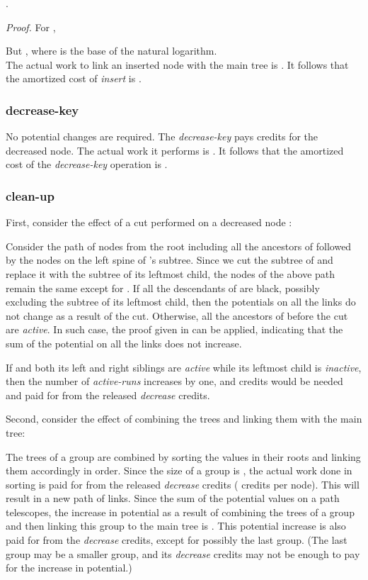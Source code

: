 \begin{prop}
.
\end{prop}

{\it Proof.}
For ,


But , where  is the base of the natural logarithm.
\hfill  \\


The actual work to link an inserted node with the main tree is . It follows that the amortized cost of {\it insert} is .


\subsubsection{decrease-key}
No potential changes are required. The {\it decrease-key} pays  credits for the decreased node. The actual work it performs is . It follows that the amortized cost of the {\it decrease-key} operation is .


\subsubsection{clean-up} 

First, consider the effect of a cut performed on a decreased node :

Consider the path of nodes from the root including all the ancestors of  followed by the nodes on the left spine of 's subtree. Since we cut the subtree of  and replace it with the subtree of its leftmost child, the nodes of the above path remain the same except for .
If all the descendants of  are black, possibly excluding the subtree of its leftmost child, then the potentials on all the links do not change as a result of the cut. Otherwise, all the ancestors of  before the cut are {\it active}. 
In such case, the proof given in \cite{elm0}can be applied, indicating that the sum of the potential on all the links does not increase.

If  and both its left and right siblings are {\it active} while its leftmost child is {\it inactive}, then the number of {\it active-runs} increases by one, and  credits would be needed and paid for from the released {\it decrease} credits. 


Second, consider the effect of combining the trees and linking them with the main tree: 

The trees of a group are combined by sorting the values in their roots and linking them accordingly in order.  Since the size of a group is , the actual work done in sorting is paid for from the released {\it decrease} credits ( credits per node). This will result in a new path of links. Since the sum of the potential values on a path telescopes, the increase in potential as a result of combining the trees of a group and then linking this group to the main tree is . This  potential increase is also paid for from the {\it decrease} credits, except for possibly the last group. (The last group may be a smaller group, and its {\it decrease} credits may not be enough to pay for the increase in potential.) 

